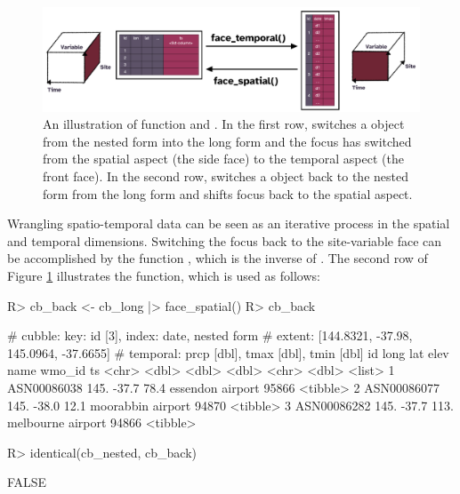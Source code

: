 \documentclass[
  shortnames]{jss}
\begin{document}
\begin{CodeChunk}
\begin{figure}

{\centering \includegraphics[width=1\linewidth]{../figures/diagram-keynotes/diagram-keynotes.002} 

}

\caption{An illustration of function  and . In the first row,  switches a  object from the nested form into the long form and the focus has switched from the spatial aspect (the side face) to the temporal aspect (the front face). In the second row,  switches a  object back to the nested form from the long form and shifts focus back to the spatial aspect.}\label{fig:face}
\end{figure}
\end{CodeChunk}

Wrangling spatio-temporal data can be seen as an iterative process in the spatial and temporal dimensions. Switching the focus back to the site-variable face can be accomplished by the function , which is the inverse of . The second row of Figure \ref{fig:face} illustrates the function, which is used as follows:

\begin{CodeChunk}
\begin{CodeInput}
R> cb_back <- cb_long |> face_spatial()
R> cb_back
\end{CodeInput}
\begin{CodeOutput}
# cubble:   key: id [3], index: date, nested form
# extent:   [144.8321, -37.98, 145.0964, -37.6655]
# temporal: prcp [dbl], tmax [dbl], tmin [dbl]
  id           long   lat  elev name              wmo_id ts      
  <chr>       <dbl> <dbl> <dbl> <chr>              <dbl> <list>  
1 ASN00086038  145. -37.7  78.4 essendon airport   95866 <tibble>
2 ASN00086077  145. -38.0  12.1 moorabbin airport  94870 <tibble>
3 ASN00086282  145. -37.7 113.  melbourne airport  94866 <tibble>
\end{CodeOutput}
\begin{CodeInput}
R> identical(cb_nested, cb_back)
\end{CodeInput}
\begin{CodeOutput}
[1] FALSE
\end{CodeOutput}
\end{CodeChunk}
\end{document}
